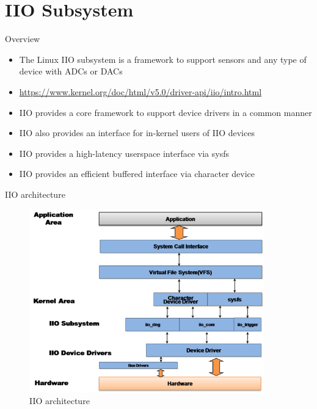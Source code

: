 \section{IIO Subsystem}

\begin{frame}
   {Overview}

   \begin{itemize}
      \item
	      The Linux IIO subsystem is a framework to support sensors and any type of device with ADCs or DACs
      \item
	      \url{https://www.kernel.org/doc/html/v5.0/driver-api/iio/intro.html}
      \item
	      IIO provides a core framework to support device drivers in a common manner
	\item
		IIO also provides an interface for in-kernel users of IIO devices
	\item
		IIO provides a high-latency userspace interface via sysfs
	\item
		IIO provides an efficient buffered interface via character device
   \end{itemize}
\end{frame}

\begin{frame}
	{IIO architecture}
	     \begin{figure}[H]
		     \includegraphics[width=4in]{IMAGES/iio_block_view}
				       \caption{IIO architecture}
	     \end{figure}
\end{frame}

